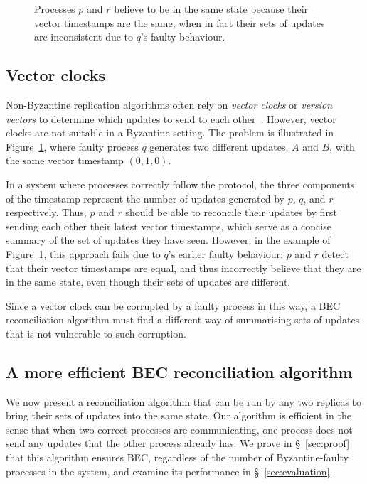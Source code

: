 \documentclass[a4paper,anonymous,USenglish]{lipics-v2019}
\begin{document}
\begin{figure}
    \centering
    
    \caption{Processes $p$ and $r$ believe to be in the same state because their vector timestamps are the same, when in fact their sets of updates are inconsistent due to $q$'s faulty behaviour.}
    \label{fig:vectorclocks}
\end{figure}

\subsection{Vector clocks}

Non-Byzantine replication algorithms often rely on \emph{vector clocks} or \emph{version vectors} to determine which updates to send to each other~\cite{Ahamad:1995,Lloyd:2011,Schwarz:1994}.
However, vector clocks are not suitable in a Byzantine setting.
The problem is illustrated in Figure~\ref{fig:vectorclocks}, where faulty process $q$ generates two different updates, $A$ and $B$, with the same vector timestamp $(0, 1, 0)$.

In a system where processes correctly follow the protocol, the three components of the timestamp represent the number of updates generated by $p$, $q$, and $r$ respectively.
Thus, $p$ and $r$ should be able to reconcile their updates by first sending each other their latest vector timestamps, which serve as a concise summary of the set of updates they have seen.
However, in the example of Figure~\ref{fig:vectorclocks}, this approach fails due to $q$'s earlier faulty behaviour: $p$ and $r$ detect that their vector timestamps are equal, and thus incorrectly believe that they are in the same state, even though their sets of updates are different.

Since a vector clock can be corrupted by a faulty process in this way, a BEC reconciliation algorithm must find a different way of summarising sets of updates that is not vulnerable to such corruption.

\subsection{A more efficient BEC reconciliation algorithm}\label{sec:algorithm1}

We now present a reconciliation algorithm that can be run by any two replicas to bring their sets of updates into the same state.
Our algorithm is efficient in the sense that when two correct processes are communicating, one process does not send any updates that the other process already has.
We prove in \S~\ref{sec:proof} that this algorithm ensures BEC, regardless of the number of Byzantine-faulty processes in the system, and examine its performance in \S~\ref{sec:evaluation}.
\end{document}
